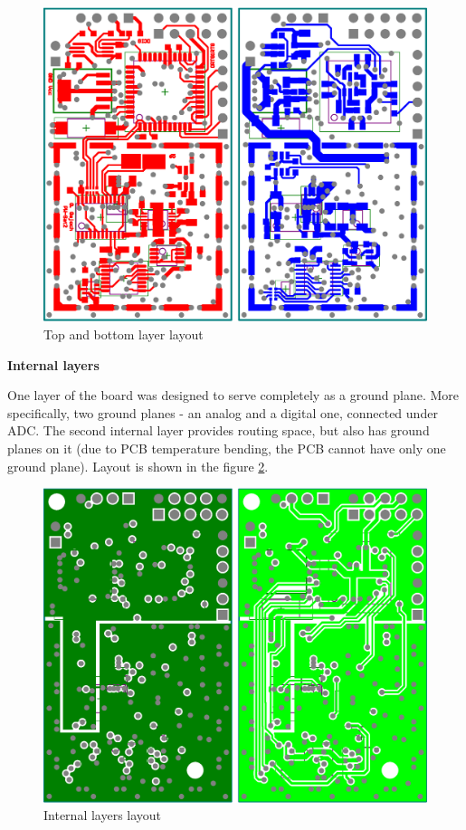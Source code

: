         \begin{figure}[H]
            \centering
            \includegraphics[width=0.5\paperwidth]{img/06/top_bottom_layer_layout.eps}
            \caption{Top and bottom layer layout}
            \label{top_bottom_layer_layout}
        \end{figure}

        \bigskip \textbf{Internal layers}

        One layer of the board was designed to serve completely as a ground plane. More specifically, two ground planes - an analog and a digital one, connected under ADC. The second internal layer provides routing space, but also has ground planes on it (due to PCB temperature bending, the PCB cannot have only one ground plane). Layout is shown in the figure \ref{internal_layers_layout}.

        \begin{figure}[H]
            \centering
            \includegraphics[width=0.5\paperwidth]{img/06/internal_layers_layout.eps}
            \caption{Internal layers layout}
            \label{internal_layers_layout}
        \end{figure}

